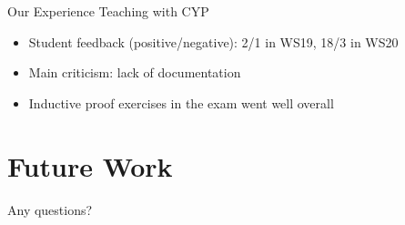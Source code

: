 \documentclass{beamer}
\begin{document}
\begin{frame}[fragile]{Our Experience Teaching with CYP}
\begin{itemize}[<+->]
  \item Student feedback (positive/negative): 2/1 in WS19, 18/3 in WS20
  \item Main criticism: lack of documentation
  \item Inductive proof exercises in the exam went well overall 
\end{itemize}
\end{frame}

\section{Future Work}

\begin{frame}[standout]
\Large{\alert{Any questions?}}

\end{frame}

\end{document}
